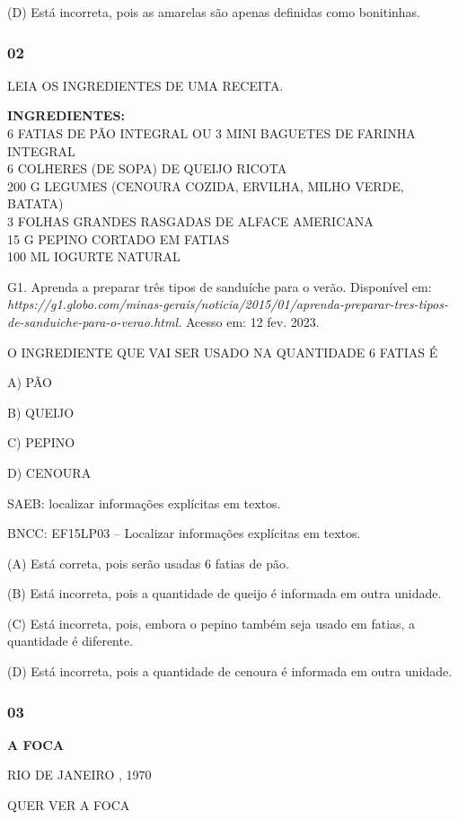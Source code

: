 (D) Está incorreta, pois as amarelas são apenas definidas como bonitinhas.

\subsubsection{02}\label{section-9}

LEIA OS INGREDIENTES DE UMA RECEITA.

\textbf{INGREDIENTES:}\\
6 FATIAS DE PÃO INTEGRAL OU 3 MINI BAGUETES DE FARINHA INTEGRAL\\
6 COLHERES (DE SOPA) DE QUEIJO RICOTA\\
200 G LEGUMES (CENOURA COZIDA, ERVILHA, MILHO VERDE, BATATA)\\
3 FOLHAS GRANDES RASGADAS DE ALFACE AMERICANA\\
15 G PEPINO CORTADO EM FATIAS\\
100 ML IOGURTE NATURAL

G1. Aprenda a preparar três tipos de sanduíche para o verão. Disponível em: {\emph{https://g1.globo.com/minas-gerais/noticia/2015/01/aprenda-preparar-tres-tipos-de-sanduiche-para-o-verao.html.}} Acesso em: 12 fev. 2023.

O INGREDIENTE QUE VAI SER USADO NA QUANTIDADE 6 FATIAS É

A) PÃO

B) QUEIJO

C) PEPINO

D) CENOURA

SAEB: localizar informações explícitas em textos.

BNCC: EF15LP03 -- Localizar informações explícitas em textos.

(A) Está correta, pois serão usadas 6 fatias de pão.

(B) Está incorreta, pois a quantidade de queijo é informada em outra unidade.

(C) Está incorreta, pois, embora o pepino também seja usado em fatias, a quantidade é diferente.

(D) Está incorreta, pois a quantidade de cenoura é informada em outra unidade.

\subsubsection{03}\label{section-10}

\textbf{A FOCA}

RIO DE JANEIRO , 1970

QUER VER A FOCA

